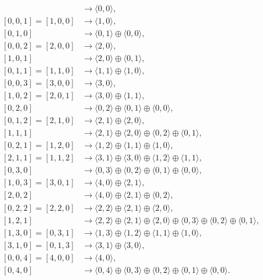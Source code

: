 \documentclass[12pt]{article}
\begin{document}
\begin{align*}
[0,0,0] &\to \langle 0,0\rangle, \\
[0,0,1]=[1,0,0] &\to \langle 1,0\rangle, \\
[0,1,0] &\to \langle 0,1\rangle\oplus \langle 0,0\rangle, \\
[0,0,2]=[2,0,0] &\to \langle 2,0\rangle, \\
[1,0,1] &\to \langle 2,0\rangle\oplus \langle 0,1\rangle, \\
[0,1,1]=[1,1,0] &\to \langle 1,1\rangle\oplus \langle 1,0\rangle, \\
[0,0,3]=[3,0,0] &\to \langle 3,0\rangle, \\
[1,0,2]=[2,0,1] &\to \langle 3,0\rangle\oplus \langle 1,1\rangle, \\
[0,2,0] &\to \langle 0,2\rangle\oplus \langle 0,1\rangle\oplus \langle 0,0\rangle, \\
[0,1,2]=[2,1,0] &\to \langle 2,1\rangle\oplus \langle 2,0\rangle, \\
[1,1,1] &\to \langle 2,1\rangle\oplus \langle 2,0\rangle\oplus \langle 0,2\rangle\oplus \langle 0,1\rangle, \\
[0,2,1]=[1,2,0] &\to \langle 1,2\rangle\oplus \langle 1,1\rangle\oplus \langle 1,0\rangle, \\
[2,1,1]=[1,1,2] &\to \langle 3,1\rangle\oplus \langle 3,0\rangle\oplus \langle 1,2\rangle\oplus \langle 1,1\rangle, \\
[0,3,0] &\to \langle 0,3\rangle\oplus \langle 0,2\rangle\oplus \langle 0,1\rangle\oplus \langle 0,0\rangle, \\
[1,0,3]=[3,0,1] &\to \langle 4,0\rangle\oplus \langle 2,1\rangle, \\
[2,0,2] &\to \langle 4,0\rangle\oplus \langle 2,1\rangle\oplus \langle 0,2\rangle, \\
[0,2,2]=[2,2,0] &\to \langle 2,2\rangle\oplus \langle 2,1\rangle\oplus \langle 2,0\rangle, \\
[1,2,1] &\to \langle 2,2\rangle\oplus \langle 2,1\rangle\oplus \langle 2,0\rangle\oplus \langle 0,3\rangle\oplus \langle 0,2\rangle\oplus \langle 0,1\rangle, \\
[1,3,0]=[0,3,1] &\to \langle 1,3\rangle\oplus \langle 1,2\rangle\oplus \langle 1,1\rangle\oplus \langle 1,0\rangle, \\
[3,1,0]=[0,1,3] &\to \langle 3,1\rangle\oplus \langle 3,0\rangle, \\
[0,0,4]=[4,0,0] &\to \langle 4,0\rangle, \\
[0,4,0] &\to \langle 0,4\rangle\oplus \langle 0,3\rangle\oplus \langle 0,2\rangle\oplus \langle 0,1\rangle\oplus \langle 0,0\rangle.
\end{align*}
\end{document}
